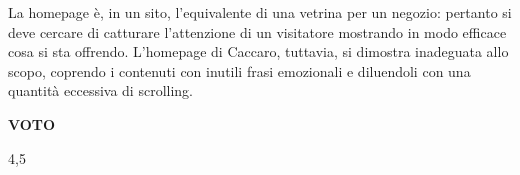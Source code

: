 La homepage è, in un sito, l'equivalente di una vetrina per un negozio: pertanto si deve cercare di catturare l'attenzione di un visitatore mostrando in modo efficace cosa si sta offrendo. L'homepage di Caccaro, tuttavia, si dimostra inadeguata allo scopo, coprendo i contenuti con inutili frasi emozionali e diluendoli con una quantità eccessiva di scrolling.\\
\begin{center}
\begin{Large}
\textbf{VOTO}\\
\vspace{0.1cm}
\end{Large}
\begin{huge}
4,5
\end{huge}
\end{center}
